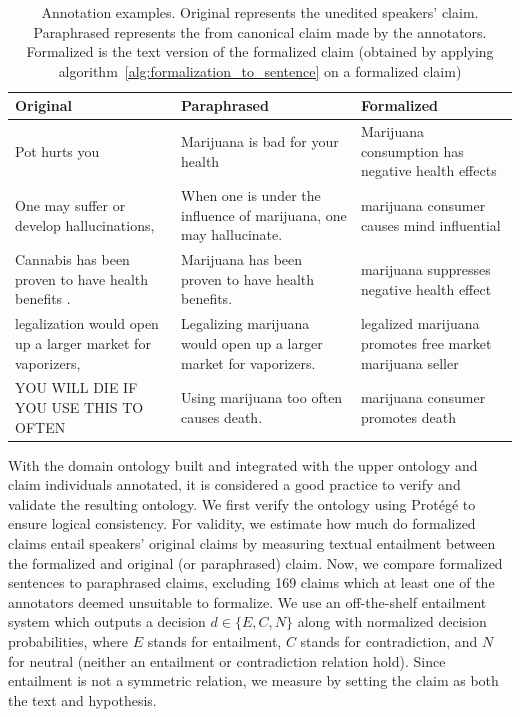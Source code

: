 \begin{table}[t]
	\begin{tabular}{p{5cm}|p{5cm}|p{5cm}}
	\toprule
Original & Paraphrased & Formalized \\
\midrule
Pot hurts you & Marijuana is bad for your health & Marijuana consumption has negative health effects \\

One may suffer or develop hallucinations, &                                                                                            
When one is under the influence of marijuana, one may hallucinate. &       
marijuana consumer causes mind influential \\ 

Cannabis has been proven to have health benefits . & 
Marijuana has been proven to have health benefits. & 
marijuana suppresses negative health effect \\

legalization would open up a larger market for vaporizers, &                                                                                          
Legalizing marijuana would open up a larger market for vaporizers. &                                           
legalized marijuana promotes free market marijuana seller \\

YOU WILL DIE IF YOU USE THIS TO OFTEN &                                                                     
Using marijuana too often causes death. &                                                                                                                                                     
marijuana consumer promotes death \\                                                         
\bottomrule
\end{tabular}
\caption{Annotation examples. Original represents the unedited speakers' claim.
	Paraphrased represents the from canonical claim made by the annotators.
	Formalized is the text version  of the formalized claim (obtained by
	applying algorithm~\ref{alg:formalization_to_sentence} on a formalized
	claim)
	}
\label{tab:ontology_annotation}
\end{table}

With the domain ontology built and integrated with the upper ontology and claim
individuals annotated, it is considered a good practice to verify and validate
the resulting ontology. 
We first verify the ontology using Prot\'{e}g\'{e} to ensure logical
consistency. For validity, we estimate how much do formalized claims entail 
speakers' original claims by measuring textual entailment between the formalized
and original (or paraphrased) claim. 
Now, we compare formalized sentences to paraphrased claims, excluding 169 claims 
which at least one of the annotators deemed unsuitable to formalize. 
We use an off-the-shelf entailment system which outputs a decision $d \in \{E, C, N\}$
along with normalized decision probabilities, where $E$ stands for entailment, 
$C$ stands for contradiction, and $N$ for neutral (neither an entailment or 
contradiction relation hold). Since entailment is not a symmetric relation, we
measure by setting the claim as both the text and hypothesis. 

